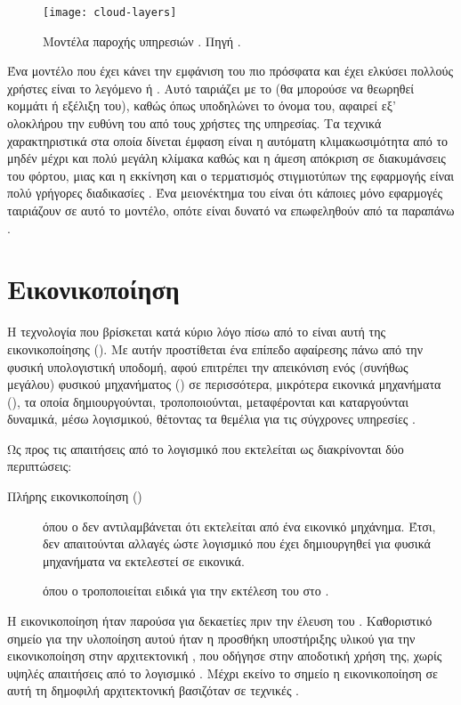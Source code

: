 \begin{figure}
    \centering
    \texttt{[image: cloud-layers]}
    \caption[Μοντέλα παροχής υπηρεσιών ]{Μοντέλα παροχής υπηρεσιών
        . Πηγή
        .}
    \label{fig:cloud}
\end{figure}

Ένα μοντέλο που έχει κάνει την εμφάνιση του πιο πρόσφατα και έχει ελκύσει
πολλούς χρήστες είναι το λεγόμενο  ή . Αυτό ταιριάζει με το  (θα μπορούσε να θεωρηθεί κομμάτι ή
εξέλιξη του), καθώς όπως υποδηλώνει το όνομα του, αφαιρεί εξ' ολοκλήρου την
ευθύνη του  από τους χρήστες της υπηρεσίας. Τα τεχνικά χαρακτηριστικά
στα οποία δίνεται έμφαση είναι η αυτόματη κλιμακωσιμότητα από το μηδέν μέχρι και
πολύ μεγάλη κλίμακα καθώς και η άμεση απόκριση σε διακυμάνσεις του φόρτου,
μιας και η εκκίνηση και ο τερματισμός στιγμιοτύπων της εφαρμογής είναι πολύ
γρήγορες διαδικασίες \cite{cloudflare-serverless}. Ένα μειονέκτημα του
 είναι ότι κάποιες μόνο εφαρμογές ταιριάζουν σε αυτό το μοντέλο,
οπότε είναι δυνατό να επωφεληθούν από τα παραπάνω \cite{serverless,
spec-serverless}.

\section{Εικονικοποίηση}
Η τεχνολογία που βρίσκεται κατά κύριο λόγο πίσω από το  είναι αυτή της
εικονικοποίησης (). Με αυτήν προστίθεται ένα επίπεδο
αφαίρεσης πάνω από την φυσική υπολογιστική υποδομή, αφού επιτρέπει την
απεικόνιση ενός (συνήθως μεγάλου) φυσικού μηχανήματος () σε
περισσότερα, μικρότερα εικονικά μηχανήματα (), τα
οποία δημιουργούνται, τροποποιούνται, μεταφέρονται και καταργούνται δυναμικά,
μέσω λογισμικού, θέτοντας τα θεμέλια για τις σύγχρονες υπηρεσίες 
\cite{wiki:hw-virtualization}.

Ως προς τις απαιτήσεις από το λογισμικό που εκτελείται ως \guest{} διακρίνονται
δύο περιπτώσεις:
\begin{description}
    \item[Πλήρης εικονικοποίηση ()] όπου ο \guest{} δεν
        αντιλαμβάνεται ότι εκτελείται από ένα εικονικό μηχάνημα. Έτσι, δεν
        απαιτούνται αλλαγές ώστε λογισμικό που έχει δημιουργηθεί για φυσικά
        μηχανήματα να εκτελεστεί σε εικονικά.
    \item[] όπου ο \guest{} τροποποιείται ειδικά για την
        εκτέλεση του στο .
\end{description}
Η εικονικοποίηση ήταν παρούσα για δεκαετίες πριν την έλευση του .
Καθοριστικό σημείο για την υλοποίηση αυτού ήταν η προσθήκη υποστήριξης υλικού
για την εικονικοποίηση στην αρχιτεκτονική , που οδήγησε στην αποδοτική
χρήση της, χωρίς υψηλές απαιτήσεις από το λογισμικό \cite{virtualization-x86}.
Μέχρι εκείνο το σημείο η εικονικοποίηση σε αυτή τη δημοφιλή αρχιτεκτονική
βασιζόταν σε τεχνικές .

